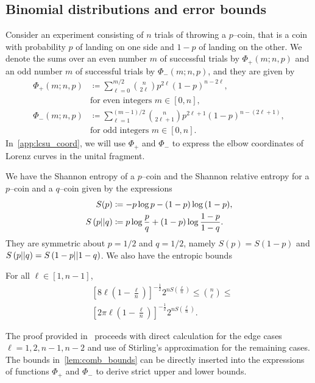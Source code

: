 \documentclass[pra,
aps,
twocolumn,
superscriptaddress,
groupedaddress,
nofootinbib,
reprint
]{revtex4-1}
\begin{document}
\subsection{Binomial distributions and error bounds}\label{app:phi}
Consider an experiment consisting of $n$ trials of throwing a $p$--coin, that is a coin with probability $p$ of landing on one side and $1-p$ of landing on the other.
We denote the sums over an even number $m$ of successful trials by $\Phi_+(m; n, p)$ and an odd number $m$ of successful trials by $\Phi_-(m; n, p)$, and they are given by
\begin{align}	
	\Phi_+(m; n, p) &\coloneqq \sum\limits_{\ell=0}^{m/2} \binom{n}{2\ell} p^{2\ell} (1-p)^{n-2\ell}, \nonumber\\ 
	&\text{for even integers } m\in[0,n], \label{eq:fp_app} \\
	\Phi_-(m; n, p) &\coloneqq \sum\limits_{\ell=1}^{(m-1)/2} \binom{n}{2\ell+1} p^{2\ell+1} (1-p)^{n-(2\ell+1)}, \nonumber\\ 
	&\text{for odd integers }m\in[0,n]. \label{eq:fn_app}
\end{align}
In~\cref{app:lcsu_coord}, we will use $\Phi_+$ and $\Phi_-$ to express the elbow coordinates of Lorenz curves in the unital fragment.

We have the Shannon entropy of a $p$--coin and the Shannon relative entropy for a $p$--coin and a $q$--coin given by the expressions
\begin{align}
	S(p) &\coloneqq -p\log{p} -(1-p)\log{(1-p)}, \label{eq:ent}\\
	S\left( p \middle\vert\middle\vert q \right) &\coloneqq p \log{\frac{p}{q}} + (1-p) \log{\frac{1-p}{1-q}}. \label{eq:ent_rel}
\end{align}
They are symmetric about $p=1/2$ and $q=1/2$, namely $S(p) = S(1-p)$ and $S\left( p \middle\vert\middle\vert q \right) = S\left( 1-p \middle\vert\middle\vert 1-q \right)$. We also have the entropic bounds
\begin{lemma}\label{lem:comb_bounds}
	For all $\ell\in [1,n-1]$,
	\begin{align}
		&\left[ 8\ell\left(1-\frac{\ell}{n}\right) \right]^{-\frac{1}{2}} 2^{n S\left(\frac{\ell}{n}\right)} \leq \binom{n}{\ell} \leq \\
		&\left[ 2\pi \ell\left(1-\frac{\ell}{n}\right) \right]^{-\frac{1}{2}} 2^{n S\left(\frac{\ell}{n}\right)}.
	\end{align}
\end{lemma}
The proof provided in~\cite{cit:ash} proceeds with direct calculation for the edge cases $\ell = 1,2, n-1, n-2$ and use of Stirling's approximation for the remaining cases. The bounds in~\cref{lem:comb_bounds} can be directly inserted into the expressions of functions $\Phi_+$ and $\Phi_-$ to derive strict upper and lower bounds.
\end{document}
